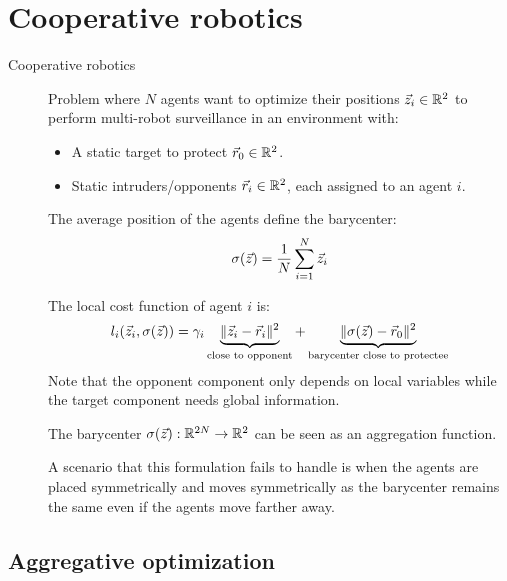 \chapter{Cooperative robotics}


\begin{description}
    \item[Cooperative robotics] 
        Problem where $N$ agents want to optimize their positions ${\vec{z}}_i \in \mathbb{R}^2$ to perform multi-robot surveillance in an environment with:
        \begin{itemize}
            \item A static target to protect ${\vec{r}}_0 \in \mathbb{R}^2$.
            \item Static intruders/opponents ${\vec{r}}_i \in \mathbb{R}^2$, each assigned to an agent $i$.
        \end{itemize}

        The average position of the agents define the barycenter:
        \[ \sigma({\vec{z}}) = \frac{1}{N} \sum_{i=1}^N {\vec{z}}_i \]

        The local cost function of agent $i$ is:
        \[
            l_i({\vec{z}}_i, \sigma({\vec{z}})) = 
            \gamma_i \underbrace{\Vert {\vec{z}}_i - {\vec{r}}_i \Vert^2}_{\text{close to opponent}} + 
            \underbrace{\Vert \sigma({\vec{z}}) - {\vec{r}}_0 \Vert^2}_{\text{barycenter close to protectee}}
        \]
        Note that the opponent component only depends on local variables while the target component needs global information.

        \begin{remark}
            The barycenter $\sigma({\vec{z}}): \mathbb{R}^{2N} \rightarrow \mathbb{R}^{2}$ can be seen as an aggregation function.
        \end{remark}

        \begin{remark}
            A scenario that this formulation fails to handle is when the agents are placed symmetrically and moves symmetrically as the barycenter remains the same even if the agents move farther away.
        \end{remark}
\end{description}



\section{Aggregative optimization}

